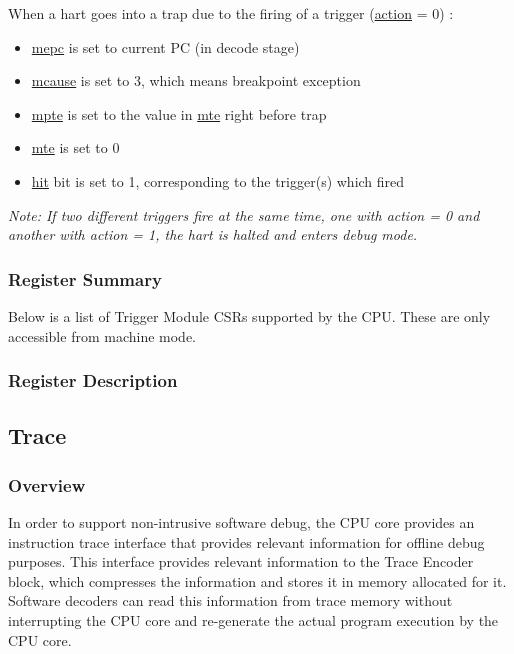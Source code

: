 \documentclass[main\_\_EN.tex]{subfiles}
\begin{document}
When a hart goes into a trap due to the firing of a trigger (\hyperref[fielddesc:MCONTROLACTION]{action} = 0) :
\begin{itemize}
    \item \hyperref[regdesc:MEPC]{mepc} is set to current PC (in decode stage)
    \item \hyperref[regdesc:MCAUSE]{mcause} is set to 3, which means breakpoint exception
    \item \hyperref[fielddesc:TCONTROLMPTE]{mpte} is set to the value in \hyperref[fielddesc:TCONTROLMTE]{mte} right before trap
    \item \hyperref[fielddesc:TCONTROLMTE]{mte} is set to 0
    \item \hyperref[fielddesc:MCONTROLHIT]{hit} bit is set to 1, corresponding to the trigger(s) which fired
\end{itemize}

\textit{Note: If two different triggers fire at the same time, one with action = 0 and another with action = 1, the hart is halted and enters debug mode.}


\hypertarget{riscvcpu-hwt-reg-summ}{}
\subsubsection{Register Summary}
\label{sec:riscvcpu-hwt-reg-summ}


Below is a list of Trigger Module CSRs supported by the CPU. These are only accessible from machine mode.




\subsubsection{Register Description}




\newpage
\subsection{Trace}
\label{sec:riscvcpu-trace}

\subsubsection{Overview}
\label{sec:riscvcpu-trace-overview}
In order to support non-intrusive software debug, the CPU core provides an instruction trace interface that provides relevant information for offline debug purposes. This interface provides relevant information to the Trace Encoder block, which compresses the information and stores it in memory allocated for it. Software decoders can read this information from trace memory without interrupting the CPU core and re-generate the actual program execution by the CPU core.
\end{document}

